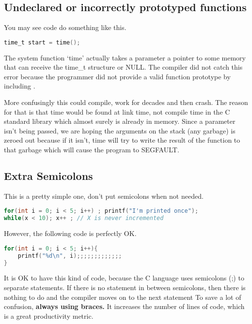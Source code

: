 \subsection{Undeclared or incorrectly prototyped functions}

You may see code do something like this.

\begin{lstlisting}[language=C]
time_t start = time();
\end{lstlisting}

The system function `time' actually takes a parameter a pointer to some memory that can receive the time\_t structure or NULL.
The compiler did not catch this error because the programmer did not provide a valid function prototype by including .

More confusingly this could compile, work for decades and then crash.
The reason for that is that time would be found at link time, not compile time in the C standard library which almost surely is already in memory.
Since a parameter isn't being passed, we are hoping the arguments on the stack (any garbage) is zeroed out because if it isn't, time will try to write the result of the function to that garbage which will cause the program to SEGFAULT.

\subsection{Extra Semicolons}

This is a pretty simple one, don't put semicolons when not needed.

\begin{lstlisting}[language=C]
for(int i = 0; i < 5; i++) ; printf("I'm printed once");
while(x < 10); x++ ; // X is never incremented
\end{lstlisting}

However, the following code is perfectly OK.

\begin{lstlisting}[language=C]
for(int i = 0; i < 5; i++){
    printf("%d\n", i);;;;;;;;;;;;;
}
\end{lstlisting}

It is OK to have this kind of code, because the C language uses semicolons (;) to separate statements.
If there is no statement in between semicolons, then there is nothing to do and the compiler moves on to the next statement
To save a lot of confusion, \textbf{always using braces.}
It increases the number of lines of code, which is a great productivity metric.


